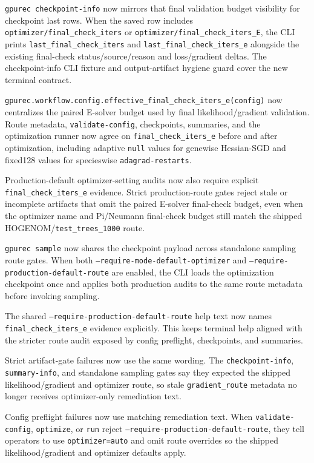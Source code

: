 \documentclass[11pt]{article}
\begin{document}
\texttt{gpurec checkpoint-info} now mirrors that final validation budget
visibility for checkpoint last rows.  When the saved row includes
\texttt{optimizer/final\_check\_iters} or
\texttt{optimizer/final\_check\_iters\_E}, the CLI prints
\texttt{last\_final\_check\_iters} and
\texttt{last\_final\_check\_iters\_e} alongside the existing final-check
status/source/reason and loss/gradient deltas.  The checkpoint-info CLI fixture
and output-artifact hygiene guard cover the new terminal contract.

\texttt{gpurec.workflow.config.effective\_final\_check\_iters\_e(config)} now
centralizes the paired E-solver budget used by final likelihood/gradient
validation.  Route metadata, \texttt{validate-config}, checkpoints, summaries,
and the optimization runner now agree on \texttt{final\_check\_iters\_e}
before and after optimization, including adaptive \texttt{null} values for
genewise Hessian-SGD and fixed128 values for specieswise
\texttt{adagrad-restarts}.

Production-default optimizer-setting audits now also require explicit
\texttt{final\_check\_iters\_e} evidence.  Strict production-route gates reject
stale or incomplete artifacts that omit the paired E-solver final-check budget,
even when the optimizer name and Pi/Neumann final-check budget still match the
shipped HOGENOM/\texttt{test\_trees\_1000} route.

\texttt{gpurec sample} now shares the checkpoint payload across standalone
sampling route gates.  When both \texttt{--require-mode-default-optimizer} and
\texttt{--require-production-default-route} are enabled, the CLI loads the
optimization checkpoint once and applies both production audits to the same route
metadata before invoking sampling.

The shared \texttt{--require-production-default-route} help text now names
\texttt{final\_check\_iters\_e} evidence explicitly.  This keeps terminal help
aligned with the stricter route audit exposed by config preflight, checkpoints,
and summaries.

Strict artifact-gate failures now use the same wording.  The
\texttt{checkpoint-info}, \texttt{summary-info}, and standalone sampling gates
say they expected the shipped likelihood/gradient and optimizer route, so stale
\texttt{gradient\_route} metadata no longer receives optimizer-only remediation
text.

Config preflight failures now use matching remediation text.  When
\texttt{validate-config}, \texttt{optimize}, or \texttt{run} reject
\texttt{--require-production-default-route}, they tell operators to use
\texttt{optimizer=auto} and omit route overrides so the shipped
likelihood/gradient and optimizer defaults apply.
\end{document}
